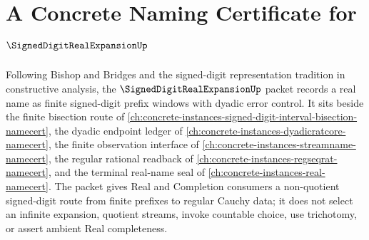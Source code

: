 \chapter{A Concrete Naming Certificate for $\SignedDigitRealExpansionUp$}
\label{ch:concrete-instances-signed-digit-real-expansion-namecert}

Following Bishop and Bridges and the signed-digit representation tradition in constructive analysis, the $\SignedDigitRealExpansionUp$ packet records a real name as finite signed-digit prefix windows with dyadic error control. It sits beside the finite bisection route of \autoref{ch:concrete-instances-signed-digit-interval-bisection-namecert}, the dyadic endpoint ledger of \autoref{ch:concrete-instances-dyadicratcore-namecert}, the finite observation interface of \autoref{ch:concrete-instances-streamname-namecert}, the regular rational readback of \autoref{ch:concrete-instances-regseqrat-namecert}, and the terminal real-name seal of \autoref{ch:concrete-instances-real-namecert}. The packet gives Real and Completion consumers a non-quotient signed-digit route from finite prefixes to regular Cauchy data; it does not select an infinite expansion, quotient streams, invoke countable choice, use trichotomy, or assert ambient Real completeness.


